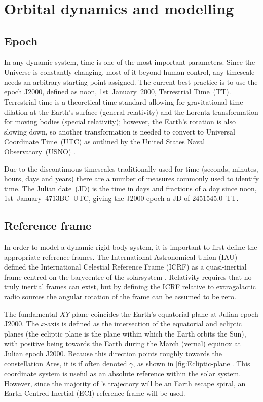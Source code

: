 \chapter{Orbital dynamics and modelling} \label{cha:Orbital-dynamics-and-modelling}

\section{Epoch} \label{sec:Epoch}

In any dynamic system, time is one of the most important parameters. Since the Universe is constantly changing, most of it beyond human control, any timescale needs an arbitrary starting point assigned. The current best practice is to use the epoch J2000, defined as noon, 1st~January~2000, Terrestrial Time~(TT). Terrestrial time is a theoretical time standard allowing for gravitational time dilation at the Earth's surface (general relativity) and the Lorentz transformation for moving bodies (special relativity); however, the Earth's rotation is also slowing down, so another transformation is needed to convert to Universal Coordinate Time~(UTC) as outlined by the United States Naval Observatory~(USNO) \textcite{web_TimeServiceDept.2008}.

Due to the discontinuous timescales traditionally used for time (seconds, minutes, hours, days and years) there are a number of measures commonly used to identify time. The Julian date~(JD) is the time in days and fractions of a day since noon, 1st~January~4713BC~UTC, giving the J2000 epoch a JD of 2451545.0~TT.

\section{Reference frame} \label{sec:Reference-Frame}

In order to model a dynamic rigid body system, it is important to first define the appropriate reference frames. The International Astronomical Union (IAU) defined the International Celestial Reference Frame (ICRF) as a quasi-inertial frame centred on the barycentre of the solarsystem \parencite{Montenbruck2000}. %
Relativity requires that no truly inertial frames can exist, but by defining the ICRF relative to extragalactic radio sources the angular rotation of the frame can be assumed to be zero.

The fundamental $XY$ plane coincides the Earth's equatorial plane at Julian epoch J2000. The $x$-axis is defined as the intersection of the equatorial and ecliptic planes (the ecliptic plane is the plane within which the Earth orbits the Sun), with positive being towards the Earth during the March (vernal) equinox at Julian epoch J2000. Because this direction points roughly towards the constellation Ares, it is if often denoted $\gamma$, as shown in \autoref{fig:Ecliptic-plane}. This coordinate system is useful as an absolute reference within the solar system. However, since the majority of \BW's trajectory will be an Earth escape spiral, an Earth-Centred Inertial (ECI) reference frame will be used.

